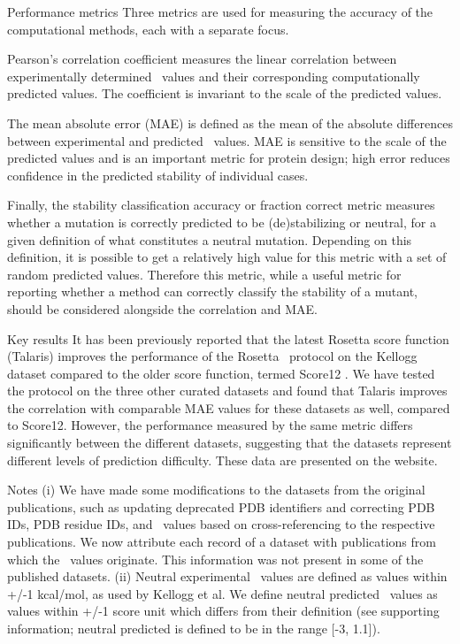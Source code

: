 Performance metrics
Three metrics are used for measuring the accuracy of the computational methods, each with a separate focus.

Pearson's correlation coefficient measures the linear correlation between experimentally determined \ddg\ values and their corresponding computationally predicted values. The coefficient is invariant to the scale of the predicted values.

The mean absolute error (MAE) is defined as the mean of the absolute differences between experimental and predicted \ddg\ values. MAE is sensitive to the scale of the predicted values and is an important metric for protein design; high error reduces confidence in the predicted stability of individual cases.

Finally, the stability classification accuracy or fraction correct metric measures whether a mutation is correctly predicted to be (de)stabilizing or neutral, for a given definition of what constitutes a neutral mutation. Depending on this definition, it is possible to get a relatively high value for this metric with a set of random predicted values. Therefore this metric, while a useful metric for reporting whether a method can correctly classify the stability of a mutant, should be considered alongside the correlation and MAE.

Key results
It has been previously reported that the latest Rosetta score function (Talaris) improves the performance of the Rosetta \ddg\ protocol on the Kellogg dataset compared to the older score function, termed Score12 \cite{omeara_combined_2015}. We have tested the protocol on the three other curated datasets and found that Talaris improves the correlation with comparable MAE values for these datasets as well, compared to Score12. However, the performance measured by the same metric differs significantly between the different datasets, suggesting that the datasets represent different levels of prediction difficulty. These data are presented on the website.

Notes
(i) We have made some modifications to the datasets from the original publications, such as updating deprecated PDB identifiers and correcting PDB IDs, PDB residue IDs, and \ddg\ values based on cross-referencing to the respective publications. We now attribute each record of a dataset with publications from which the \ddg\ values originate. This information was not present in some of the published datasets. (ii) Neutral experimental \ddg\ values are defined as values within +/-1 kcal/mol, as used by Kellogg et al. We define neutral predicted \ddg\ values as values within +/-1 score unit which differs from their definition (see \cite{kellogg_role_2011} supporting information; neutral predicted is defined to be in the range [-3, 1.1]).

